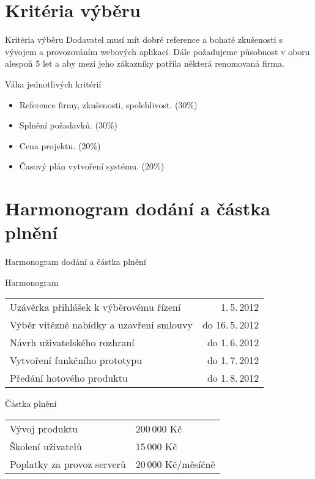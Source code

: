 \documentclass[10pt,hyperref={unicode=true}]{beamer}
\begin{document}
\section{Kritéria výběru}

\begin{frame}{Kritéria výběru}	
  Dodavatel musí mít dobré reference a bohaté zkušenosti s vývojem a provozováním 
  webových aplikací. Dále požadujeme působnost v oboru alespoň 5 let a aby mezi jeho
  zákazníky patřila některá renomovaná firma.
  \vspace{5mm}
  
  \begin{block}{Váha jednotlivých kritérií}
		\begin{itemize}
			\item Reference firmy, zkušenosti, spolehlivost. (30\%)
			\item Splnění požadavků. (30\%)
      \item Cena projektu. (20\%)
      \item Časový plán vytvoření systému. (20\%)
		\end{itemize}
	\end{block}
\end{frame}

\section{Harmonogram dodání a částka plnění}

\begin{frame}{Harmonogram dodání a částka plnění}
  \begin{block}{Harmonogram}    \small
      \begin{tabular}{ l r }
        Uzávěrka přihlášek k výběrovému řízení  & 1.\,5.\,2012 \\
        Výběr vítězné nabídky a uzavření smlouvy  & do 16.\,5.\,2012 \\
        Návrh uživatelského rozhraní  & do 1.\,6.\,2012 \\
        Vytvoření funkčního prototypu  & do 1.\,7.\,2012 \\
        Předání hotového produktu  & do 1.\,8.\,2012 \\
      \end{tabular}
  \end{block}
  
  \begin{block}{Částka plnění}   \small
      \begin{tabular}{ l l }
        Vývoj produktu & 200\,000 Kč \\
        Školení uživatelů   & 15\,000 Kč \\
        Poplatky za provoz serverů & 20\,000 Kč/měsíčně \\
      \end{tabular}
  \end{block}
\end{frame}
\end{document}
